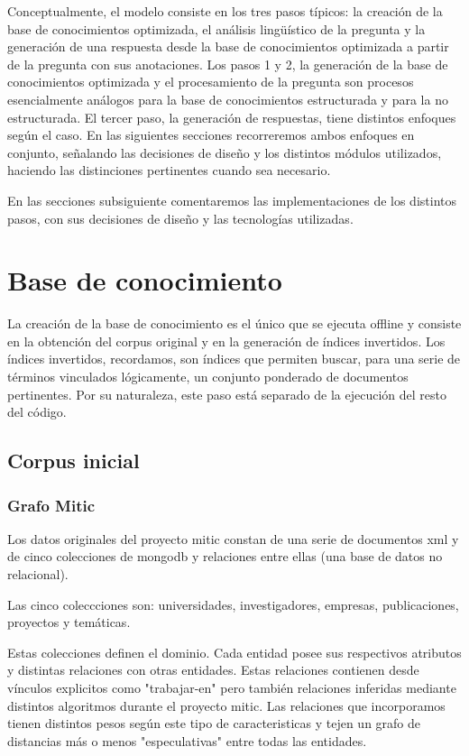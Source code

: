 Conceptualmente, el modelo consiste en los tres pasos típicos: la
creación de la base de conocimientos optimizada, el análisis
lingüístico de la pregunta y la generación de una respuesta desde
la base de conocimientos optimizada a partir de la pregunta con sus
anotaciones. 
Los pasos 1 y 2, la generación de la base de conocimientos optimizada y el procesamiento de la pregunta son procesos
esencialmente análogos para la base de conocimientos estructurada y para la no estructurada. El tercer paso, la generación de respuestas,
tiene distintos enfoques según el caso. 
En las siguientes secciones recorreremos ambos enfoques en conjunto, señalando las decisiones de dise\~no y los distintos módulos
utilizados, haciendo las distinciones pertinentes cuando sea necesario.

En las secciones subsiguiente comentaremos las implementaciones de los
distintos pasos, con sus decisiones de dise\~no y las tecnologías
utilizadas. 


\bigskip

\section{Base de conocimiento}
\bigskip


La creación de la base de conocimiento es el único que se ejecuta offline
y consiste en la obtención del corpus original y en la generación de índices
invertidos. Los índices invertidos, recordamos, son índices que permiten
buscar, para una serie de términos vinculados lógicamente, un conjunto
ponderado de documentos pertinentes. Por su naturaleza, este paso está 
separado de la ejecución del resto del código.

\subsection{Corpus inicial}

\subsubsection{Grafo Mitic}
Los datos originales del proyecto mitic constan de una serie de documentos 
xml y de cinco colecciones de mongodb y relaciones entre ellas (una base de datos no relacional).

Las cinco coleccciones son: universidades, investigadores, empresas,
publicaciones, proyectos y temáticas.

Estas colecciones definen el dominio. Cada entidad 
posee sus respectivos atributos y distintas relaciones con otras entidades.
Estas relaciones contienen desde vínculos explicitos como "trabajar-en"
pero también relaciones inferidas mediante distintos algoritmos durante el proyecto mitic.
Las relaciones que incorporamos tienen distintos pesos según este tipo de caracteristicas
y tejen un grafo de distancias más o menos "especulativas" entre todas las entidades.

